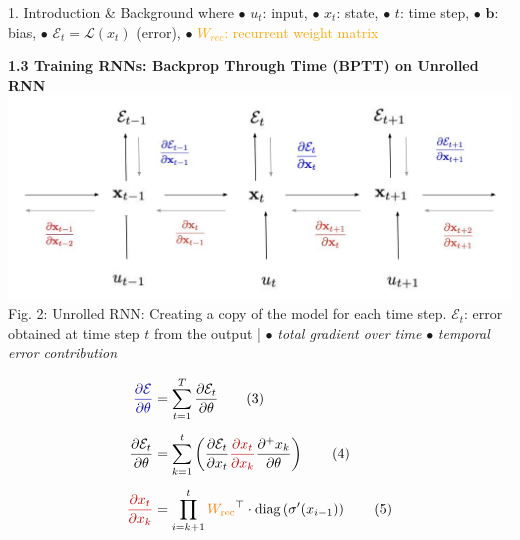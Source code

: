 \documentclass[final]{beamer}
\begin{document}
\begin{frame}[t]
\begin{columns}[t,totalwidth=\textwidth]
\begin{column}{0.3\textwidth}
\begin{block}{1. Introduction \& Background}
        \vspace{0.5em}
        where $\bullet$ $u_t$: input, $\bullet$  $x_t$: state, $\bullet$  $t$: time step, $\bullet$  $\mathbf{b}$: bias,  $\bullet$  $\mathcal{E}_t = \mathcal{L}(x_t)$ (error),  $\bullet$  \textcolor{orange}{$W_{rec}$: recurrent weight matrix}

        \vspace{0.5em}

        \vspace{1em}
        \textbf{1.3 Training RNNs: Backprop Through Time (BPTT) on Unrolled RNN}\\
        \includegraphics[width=0.95\linewidth]{figures/RNN.png}\\[0.5em]
         Fig. 2: Unrolled RNN: Creating a copy of the model for each time step. \textcolor{myblue}{$\mathcal{E}_t$:}  error obtained at time step $t$ from the output |
          $\bullet$ \textcolor{myblue}{ \textit{total gradient over time}}
        \quad
        $\bullet$ \textcolor{myred}{ \textit{temporal error contribution}}


        \vspace{0.3em}
        \begin{align*}
          \textcolor{myblue}{\frac{\partial \mathcal{E}}{\partial \theta}} &=
          \sum_{t=1}^{T} \frac{\partial \mathcal{E}_t}{\partial \theta} \hspace{2em} \text{(3)} \\[0.5em]
          \frac{\partial \mathcal{E}_t}{\partial \theta} &=
          \sum_{k=1}^{t} 
          \left( {\frac{\partial \mathcal{E}_t}{\partial x_t}} 
          \textcolor{myred}{\frac{\partial x_t}{\partial x_k}}
          \frac{\partial^+ x_k}{\partial \theta} \right) \hspace{2em} \text{(4)} \\[0.5em]
          \textcolor{myred}{\frac{\partial x_t}{\partial x_k}} &=
          \prod_{i=k+1}^{t}
          \textcolor{orange}{W_{\text{rec}}}^\top \cdot \text{diag}\left(\sigma'(x_{i-1})\right) \hspace{2em} \text{(5)}
        \end{align*}
        

\end{block}
\end{column}
\end{columns}
\end{frame}
\end{document}
